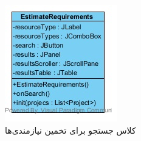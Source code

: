 \begin{figure}[H]
	\centering
	\begin{subfigure}[b]{0.4\textwidth}
		\includegraphics[width=\textwidth]{img/class-design/ui/EstimateRequirements.jpg}
		\caption{کلاس جستجو برای تخمین نیازمندی‌ها}
	\end{subfigure}
	\begin{subfigure}[b]{0.4\textwidth}

\end{subfigure}
\end{figure}
